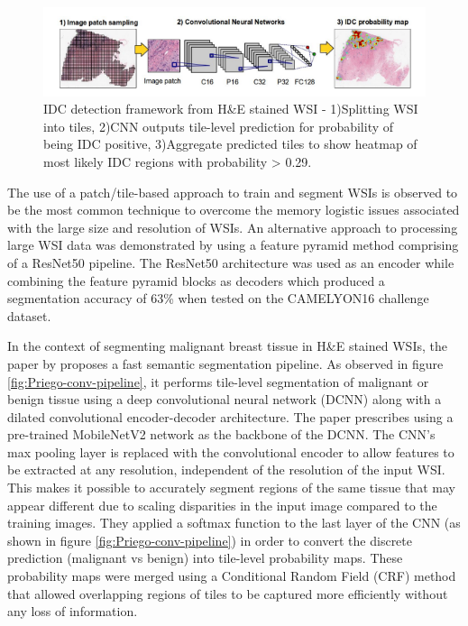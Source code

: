 \documentclass{l4proj}
\begin{document}
\begin{figure}[h]
    \centering
    \includegraphics[scale=0.9]{images/Cruz-Roa-Ductal-Carcinoma-example.png}
    \caption{IDC detection framework from H\&E stained WSI - 1)Splitting WSI into tiles, 2)CNN outputs tile-level prediction for probability of being IDC positive, 3)Aggregate predicted tiles to show heatmap of most likely IDC regions with probability > 0.29.}
    \label{fig:ductal-carcinoma-figure}
\end{figure}

The use of a patch/tile-based approach to train and segment WSIs is observed to be the most common technique to overcome the memory logistic issues associated with the large size and resolution of WSIs. An alternative approach to processing large WSI data was demonstrated by \cite{qin2018large} using a feature pyramid method comprising of a ResNet50 pipeline. The ResNet50 architecture was used as an encoder while combining the feature pyramid blocks as decoders which produced a segmentation accuracy of 63\% when tested on the CAMELYON16 challenge dataset. 

In the context of segmenting malignant breast tissue in H\&E stained WSIs, the paper by \cite{priego2020automatic} proposes a fast semantic segmentation pipeline. As observed in figure \ref{fig:Priego-conv-pipeline}, it performs tile-level segmentation of malignant or benign tissue using a deep convolutional neural network (DCNN) along with a dilated convolutional encoder-decoder architecture. The paper prescribes using a pre-trained MobileNetV2 network as the backbone of the DCNN. The CNN's max pooling layer is replaced with the convolutional encoder to allow features to be extracted at any resolution, independent of the resolution of the input WSI. This makes it possible to accurately segment regions of the same tissue that may appear different due to scaling disparities in the input image compared to the training images. They applied a softmax function to the last layer of the CNN (as shown in figure \ref{fig:Priego-conv-pipeline}) in order to convert the discrete prediction (malignant vs benign) into tile-level probability maps. These probability maps were merged using a Conditional Random Field (CRF) method that allowed overlapping regions of tiles to be captured more efficiently without any loss of information. 
\end{document}
